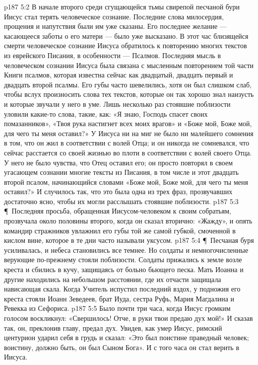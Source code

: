 \vs p187 5:2 В начале второго среди сгущающейся тьмы свирепой песчаной бури Иисус стал терять человеческое сознание. Последние слова милосердия, прощения и напутствия были им уже сказаны. Его последнее желание --- касающееся заботы о его матери --- было уже высказано. В этот час близящейся смерти человеческое сознание Иисуса обратилось к повторению многих текстов из еврейского Писания, в особенности --- Псалмов. Последняя мысль в человеческом сознании Иисуса была связана с мысленным повторением той части Книги псалмов, которая известна сейчас как двадцатый, двадцать первый и двадцать второй псалмы. Его губы часто шевелились, хотя он был слишком слаб, чтобы вслух произносить слова тех текстов, которые он так хорошо знал наизусть и которые звучали у него в уме. Лишь несколько раз стоявшие поблизости уловили какие\hyp{}то слова, такие, как: «Я знаю, Господь спасет своих помазанников», «Твоя рука настигнет всех моих врагов» и «Боже мой, Боже мой, для чего ты меня оставил?» У Иисуса ни на миг не было ни малейшего сомнения в том, что он жил в соответствии с волей Отца; и он никогда не сомневался, что сейчас расстается со своей жизнью во плоти в соответствии с волей своего Отца. У него не было чувства, что Отец оставил его; он просто повторял в своем угасающем сознании многие тексты из Писания, в том числе и этот двадцать второй псалом, начинающийся словами «Боже мой, Боже мой, для чего ты меня оставил?» И случилось так, что это была одна из трех фраз, прозвучавших достаточно ясно, чтобы их могли расслышать стоявшие поблизости.
\vs p187 5:3 \P\ Последняя просьба, обращенная Иисусом\hyp{}человеком к своим собратьям, прозвучала около половины второго, когда он сказал вторично: «Жажду», и опять командир стражников увлажнил его губы той же самой губкой, смоченной в кислом вине, которое в те дни часто называли уксусом.
\vs p187 5:4 \P\ Песчаная буря усиливалась, и небеса становились все темнее. Но солдаты и немногочисленные верующие по\hyp{}прежнему стояли поблизости. Солдаты прижались к земле возле креста и сбились в кучу, защищаясь от больно бьющего песка. Мать Иоанна и другие находились на небольшом расстоянии, где их отчасти защищала нависающая скала. Когда Учитель испустил последний вздох, у подножия его креста стояли Иоанн Зеведеев, брат Иуда, сестра Руфь, Мария Магдалина и Ревекка из Сефориса.
\vs p187 5:5 Было почти три часа, когда Иисус громким голосом воскликнул: «Свершилось! Отче, в руки твои предаю дух мой!» И сказав так, он, преклонив главу, предал дух. Увидев, как умер Иисус, римский центурион ударил себя в грудь и сказал: «Это был поистине праведный человек; воистину, должно быть, он был Сыном Бога». И с того часа он стал верить в Иисуса.
